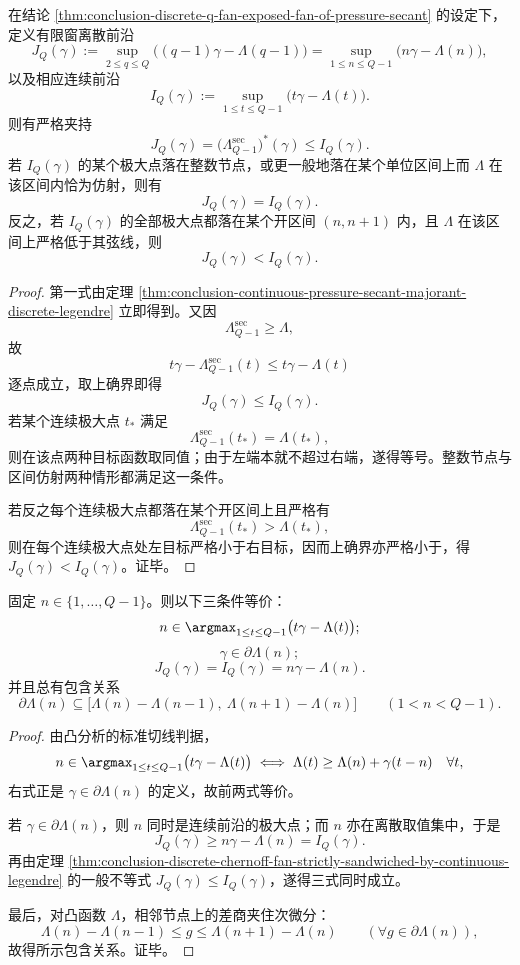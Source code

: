 \begin{theorem}\label{thm:conclusion-discrete-chernoff-fan-strictly-sandwiched-by-continuous-legendre}
在结论 \ref{thm:conclusion-discrete-q-fan-exposed-fan-of-pressure-secant} 的设定下，定义有限窗离散前沿
\[
J_Q(\gamma)
:=
\sup_{2\le q\le Q}\bigl((q-1)\gamma-\Lambda(q-1)\bigr)
=
\sup_{1\le n\le Q-1}\bigl(n\gamma-\Lambda(n)\bigr),
\]
以及相应连续前沿
\[
I_Q(\gamma):=
\sup_{1\le t\le Q-1}\bigl(t\gamma-\Lambda(t)\bigr).
\]
则有严格夹持
\[
J_Q(\gamma)
=
\bigl(\Lambda_{Q-1}^{\mathrm{sec}}\bigr)^\ast(\gamma)
\le
I_Q(\gamma).
\]
若 \(I_Q(\gamma)\) 的某个极大点落在整数节点，或更一般地落在某个单位区间上而 \(\Lambda\) 在该区间内恰为仿射，则有
\[
J_Q(\gamma)=I_Q(\gamma).
\]
反之，若 \(I_Q(\gamma)\) 的全部极大点都落在某个开区间 \((n,n+1)\) 内，且 \(\Lambda\) 在该区间上严格低于其弦线，则
\[
J_Q(\gamma)<I_Q(\gamma).
\]
\end{theorem}
\begin{proof}
第一式由定理 \ref{thm:conclusion-continuous-pressure-secant-majorant-discrete-legendre} 立即得到。又因
\[
\Lambda_{Q-1}^{\mathrm{sec}}\ge \Lambda,
\]
故
\[
t\gamma-\Lambda_{Q-1}^{\mathrm{sec}}(t)\le t\gamma-\Lambda(t)
\]
逐点成立，取上确界即得
\[
J_Q(\gamma)\le I_Q(\gamma).
\]
若某个连续极大点 \(t_\ast\) 满足
\[
\Lambda_{Q-1}^{\mathrm{sec}}(t_\ast)=\Lambda(t_\ast),
\]
则在该点两种目标函数取同值；由于左端本就不超过右端，遂得等号。整数节点与区间仿射两种情形都满足这一条件。

若反之每个连续极大点都落在某个开区间上且严格有
\[
\Lambda_{Q-1}^{\mathrm{sec}}(t_\ast)>\Lambda(t_\ast),
\]
则在每个连续极大点处左目标严格小于右目标，因而上确界亦严格小于，得 \(J_Q(\gamma)<I_Q(\gamma)\)。证毕。
\end{proof}

\begin{theorem}[整数相的精确可达性判据]\label{thm:conclusion-integer-phase-exact-attainability}
固定 \(n\in\{1,\dots,Q-1\}\)。则以下三条件等价：
\[
n\in \argmax_{1\le t\le Q-1}\bigl(t\gamma-\Lambda(t)\bigr);
\]
\[
\gamma\in \partial \Lambda(n);
\]
\[
J_Q(\gamma)=I_Q(\gamma)=n\gamma-\Lambda(n).
\]
并且总有包含关系
\[
\partial \Lambda(n)\subseteq
\bigl[\Lambda(n)-\Lambda(n-1),\ \Lambda(n+1)-\Lambda(n)\bigr]
\qquad
(1<n<Q-1).
\]
\end{theorem}
\begin{proof}
由凸分析的标准切线判据，
\[
n\in\argmax_{1\le t\le Q-1}\bigl(t\gamma-\Lambda(t)\bigr)
\iff
\Lambda(t)\ge \Lambda(n)+\gamma(t-n)\quad \forall t,
\]
右式正是 \(\gamma\in\partial\Lambda(n)\) 的定义，故前两式等价。

若 \(\gamma\in\partial\Lambda(n)\)，则 \(n\) 同时是连续前沿的极大点；而 \(n\) 亦在离散取值集中，于是
\[
J_Q(\gamma)\ge n\gamma-\Lambda(n)=I_Q(\gamma).
\]
再由定理 \ref{thm:conclusion-discrete-chernoff-fan-strictly-sandwiched-by-continuous-legendre} 的一般不等式 \(J_Q(\gamma)\le I_Q(\gamma)\)，遂得三式同时成立。

最后，对凸函数 \(\Lambda\)，相邻节点上的差商夹住次微分：
\[
\Lambda(n)-\Lambda(n-1)\le g\le \Lambda(n+1)-\Lambda(n)
\qquad
(\forall g\in\partial\Lambda(n)),
\]
故得所示包含关系。证毕。
\end{proof}

